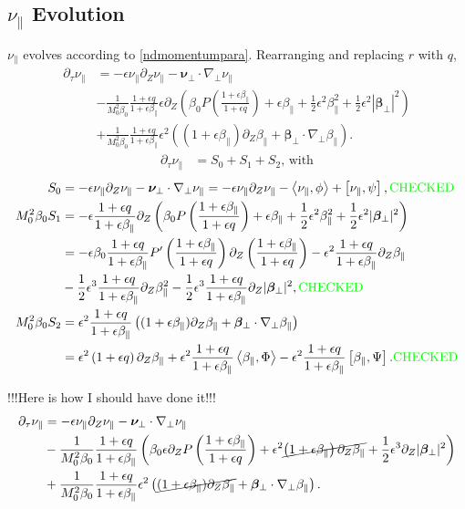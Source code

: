 \documentclass{article}
\newcommand{\para}{\parallel}
\newcommand{\ep}{\epsilon}
\newcommand{\np}{\nabla_\perp}
\newcommand{\p}{\partial}
\newcommand{\fr}{\frac{1+\ep q}{1+\ep\beta_\para}}
\newcommand{\frinv}{\frac{1+\ep\beta_\para}{1+\ep q}}
\newcommand{\pth} [1] {\left( #1 \right) }
\newcommand{\br} [1] {\left[ #1 \right] }
\begin{document}
\subsection{$\nu_\para$ Evolution}
$\nu_\para$ evolves according to \eqref{ndmomentumpara}. Rearranging and replacing $r$ with $q$, 
\begin{align*}
    \p_\tau\nu_\para &= -\ep\nu_\para\p_Z\nu_\para - \bm{\nu}_\perp\cdot \np\nu_\para \\ 
        &- \frac{1}{M_0^2\beta_0} \fr\ep\p_Z \pth{\beta_0P\pth{\frinv} + \ep\beta_\para + \frac{1}{2}\ep^2\beta_\para^2 + \frac{1}{2}\ep^2|\bm{\beta}_\perp|^2} \\ 
        &+ \frac{1}{M_0^2\beta_0} \fr\ep^2 \pth{(1+\ep\beta_\para)\p_Z\beta_\para + \bm{\beta}_\perp\cdot\np\beta_\para}. 
\end{align*}
\begin{align} \label{nuparaevolution} 
    \p_\tau\nu_\para &= S_0 + S_1 + S_2 \text{, with}
\end{align}
\begin{align*}
    S_0 &= -\ep\nu_\para\p_Z\nu_\para - \bm{\nu}_\perp\cdot\np\nu_\para = -\ep\nu_\para \p_Z\nu_\para - \Braket{\nu_\para, \phi} + \br{\nu_\para, \psi}, \text{\color{green}CHECKED}  \\ 
    M_0^2\beta_0 S_1 &= -\ep\fr\p_Z\pth{\beta_0P\pth{\frinv} + \ep\beta_\para + \frac{1}{2}\ep^2\beta_\para^2 + \frac{1}{2}\ep^2|\bm{\beta}_\perp|^2} \\ 
        &= -\ep\beta_0\fr P'\pth{\frinv}\p_Z \pth{\frinv} - \ep^2\fr\p_Z\beta_\para \\ 
        &- \frac{1}{2}\ep^3\fr\p_Z\beta_\para^2 - \frac{1}{2}\ep^3\fr\p_Z |\bm{\beta}_\perp|^2, \text{\color{green}CHECKED}  \\ 
    M_0^2\beta_0 S_2 &= \ep^2\fr \pth{(1+\ep\beta_\para)\p_Z\beta_\para + \bm{\beta}_\perp\cdot\np\beta_\para} \\ 
        &= \ep^2\pth{1+\ep q}\p_Z\beta_\para + \ep^2\fr\Braket{\beta_\para,\Phi} - \ep^2\fr\br{\beta_\para, \Psi}. \text{\color{green}CHECKED} 
\end{align*} 

!!!Here is how I should have done it!!!
\begin{align*}
    \p_\tau\nu_\para &= -\ep\nu_\para\p_Z\nu_\para - \bm{\nu}_\perp\cdot \np\nu_\para \\ 
        &- \frac{1}{M_0^2\beta_0} \fr \pth{\beta_0\ep \p_ZP\pth{\frinv} + \ep^2 \cancel{\pth{1+\ep\beta_\para}\p_Z\beta_\para} + \frac{1}{2}\ep^3\p_Z|\bm{\beta}_\perp|^2} \\ 
        &+ \frac{1}{M_0^2\beta_0} \fr\ep^2 \pth{\cancel{(1+\ep\beta_\para)\p_Z\beta_\para} + \bm{\beta}_\perp\cdot\np\beta_\para}. 
\end{align*}
\end{document}
